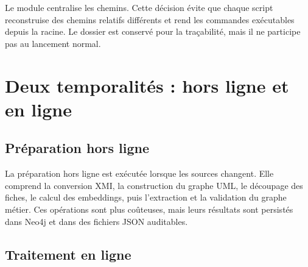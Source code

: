 Le module  centralise les chemins. Cette décision évite que chaque
script reconstruise des chemins relatifs différents et rend les commandes exécutables
depuis la racine. Le dossier  est conservé pour la traçabilité, mais il ne
participe pas au lancement normal.

\section{Deux temporalités : hors ligne et en ligne}

\subsection{Préparation hors ligne}

La préparation hors ligne est exécutée lorsque les sources changent. Elle comprend la
conversion XMI, la construction du graphe UML, le découpage des fiches, le calcul des
embeddings, puis l'extraction et la validation du graphe métier. Ces opérations sont plus
coûteuses, mais leurs résultats sont persistés dans Neo4j et dans des fichiers JSON auditables.

\begin{center}
\end{center}

\subsection{Traitement en ligne}


